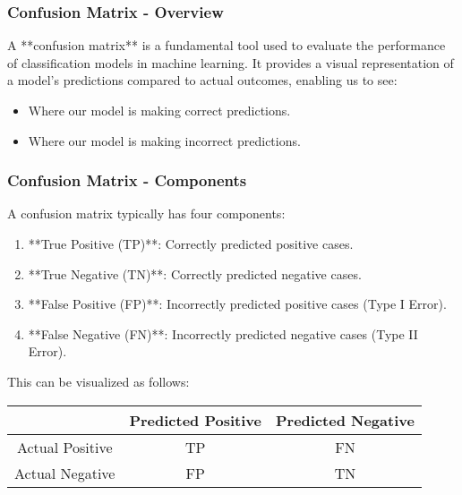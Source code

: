 \documentclass[aspectratio=169]{beamer}
\begin{document}
\begin{frame}[fragile]
    \frametitle{Confusion Matrix - Overview}
    A **confusion matrix** is a fundamental tool used to evaluate the performance of classification models in machine learning. It provides a visual representation of a model's predictions compared to actual outcomes, enabling us to see:
    \begin{itemize}
        \item Where our model is making correct predictions.
        \item Where our model is making incorrect predictions.
    \end{itemize}
\end{frame}

\begin{frame}[fragile]
    \frametitle{Confusion Matrix - Components}
    A confusion matrix typically has four components:
    \begin{enumerate}
        \item **True Positive (TP)**: Correctly predicted positive cases.
        \item **True Negative (TN)**: Correctly predicted negative cases.
        \item **False Positive (FP)**: Incorrectly predicted positive cases (Type I Error).
        \item **False Negative (FN)**: Incorrectly predicted negative cases (Type II Error).
    \end{enumerate}
    This can be visualized as follows:
    \begin{center}
    \begin{tabular}{|c|c|c|}
        \hline
        & Predicted Positive & Predicted Negative \\
        \hline
        Actual Positive & TP & FN \\
        \hline
        Actual Negative & FP & TN \\
        \hline
    \end{tabular}
    \end{center}
\end{frame}
\end{document}
